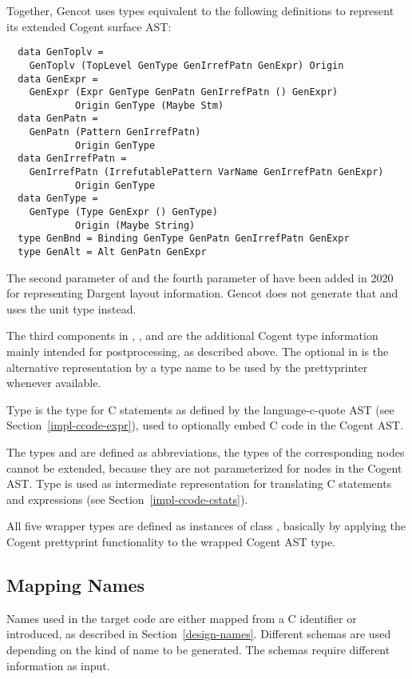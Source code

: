 Together, Gencot uses types equivalent to the following definitions to represent its extended Cogent surface AST:
\begin{verbatim}
  data GenToplv =
    GenToplv (TopLevel GenType GenIrrefPatn GenExpr) Origin
  data GenExpr =
    GenExpr (Expr GenType GenPatn GenIrrefPatn () GenExpr)
            Origin GenType (Maybe Stm)
  data GenPatn =
    GenPatn (Pattern GenIrrefPatn)
            Origin GenType
  data GenIrrefPatn = 
    GenIrrefPatn (IrrefutablePattern VarName GenIrrefPatn GenExpr)
            Origin GenType
  data GenType = 
    GenType (Type GenExpr () GenType)
            Origin (Maybe String)
  type GenBnd = Binding GenType GenPatn GenIrrefPatn GenExpr
  type GenAlt = Alt GenPatn GenExpr
\end{verbatim}
The second parameter of  and the fourth parameter of  have been added in 2020 for representing 
Dargent layout information. Gencot does not generate that and uses the unit type instead.

The third components in , , and  are the additional Cogent type information
mainly intended for postprocessing, as described above. The optional  in  is the alternative
representation by a type name to be used by the prettyprinter whenever available.

Type  is the type for C statements as defined by the language-c-quote AST 
(see Section~\ref{impl-ccode-expr}), used to optionally embed C code in the Cogent AST.

The types  and  are defined as abbreviations, the types of the corresponding nodes cannot be extended,
because they are not parameterized for  nodes in the Cogent AST. Type  is used as intermediate
representation for translating C statements and expressions (see Section~\ref{impl-ccode-cstats}).

All five wrapper types are defined as instances of class , basically by applying the Cogent prettyprint
functionality to the wrapped Cogent AST type.

\subsection{Mapping Names}
\label{impl-ccode-names}

Names used in the target code are either mapped from a C identifier or introduced, as described in 
Section~\ref{design-names}. Different schemas are used depending on the kind of name to be generated.
The schemas require different information as input.

